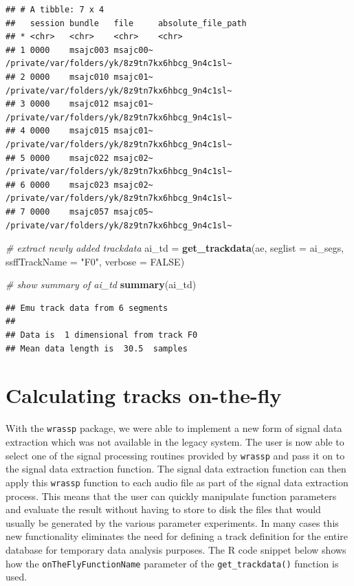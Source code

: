 \documentclass[]{book}
\newenvironment{Shaded}{\begin{snugshade}}{\end{snugshade}}
\newcommand{\CommentTok}[1]{\textcolor[rgb]{0.56,0.35,0.01}{\textit{#1}}}
\newcommand{\DataTypeTok}[1]{\textcolor[rgb]{0.13,0.29,0.53}{#1}}
\newcommand{\KeywordTok}[1]{\textcolor[rgb]{0.13,0.29,0.53}{\textbf{#1}}}
\newcommand{\NormalTok}[1]{#1}
\newcommand{\OtherTok}[1]{\textcolor[rgb]{0.56,0.35,0.01}{#1}}
\newcommand{\StringTok}[1]{\textcolor[rgb]{0.31,0.60,0.02}{#1}}
\theoremstyle{definition}
\theoremstyle{definition}
\theoremstyle{definition}
\theoremstyle{remark}
\begin{document}
\begin{verbatim}
## # A tibble: 7 x 4
##   session bundle   file     absolute_file_path                            
## * <chr>   <chr>    <chr>    <chr>                                         
## 1 0000    msajc003 msajc00~ /private/var/folders/yk/8z9tn7kx6hbcg_9n4c1sl~
## 2 0000    msajc010 msajc01~ /private/var/folders/yk/8z9tn7kx6hbcg_9n4c1sl~
## 3 0000    msajc012 msajc01~ /private/var/folders/yk/8z9tn7kx6hbcg_9n4c1sl~
## 4 0000    msajc015 msajc01~ /private/var/folders/yk/8z9tn7kx6hbcg_9n4c1sl~
## 5 0000    msajc022 msajc02~ /private/var/folders/yk/8z9tn7kx6hbcg_9n4c1sl~
## 6 0000    msajc023 msajc02~ /private/var/folders/yk/8z9tn7kx6hbcg_9n4c1sl~
## 7 0000    msajc057 msajc05~ /private/var/folders/yk/8z9tn7kx6hbcg_9n4c1sl~
\end{verbatim}

\begin{Shaded}
\begin{Highlighting}[]
\CommentTok{# extract newly added trackdata}
\NormalTok{ai_td =}\StringTok{ }\KeywordTok{get_trackdata}\NormalTok{(ae,}
                      \DataTypeTok{seglist =}\NormalTok{ ai_segs,}
                      \DataTypeTok{ssffTrackName =} \StringTok{"F0"}\NormalTok{,}
                      \DataTypeTok{verbose =} \OtherTok{FALSE}\NormalTok{)}

\CommentTok{# show summary of ai_td}
\KeywordTok{summary}\NormalTok{(ai_td)}
\end{Highlighting}
\end{Shaded}

\begin{verbatim}
## Emu track data from 6 segments
## 
## Data is  1 dimensional from track F0 
## Mean data length is  30.5  samples
\end{verbatim}

\hypertarget{calculating-tracks-on-the-fly}{%
\section{Calculating tracks
on-the-fly}\label{calculating-tracks-on-the-fly}}

With the \texttt{wrassp} package, we were able to implement a new form
of signal data extraction which was not available in the legacy system.
The user is now able to select one of the signal processing routines
provided by \texttt{wrassp} and pass it on to the signal data extraction
function. The signal data extraction function can then apply this
\texttt{wrassp} function to each audio file as part of the signal data
extraction process. This means that the user can quickly manipulate
function parameters and evaluate the result without having to store to
disk the files that would usually be generated by the various parameter
experiments. In many cases this new functionality eliminates the need
for defining a track definition for the entire database for temporary
data analysis purposes. The R code snippet below shows how the
\texttt{onTheFlyFunctionName} parameter of the \texttt{get\_trackdata()}
function is used.
\end{document}
